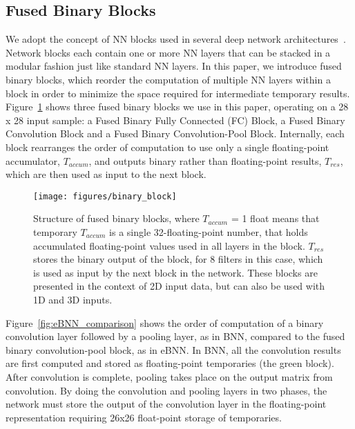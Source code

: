 \documentclass[10pt,emptycopyrightspace]{ewsn-proc}
\begin{document}
\subsection{Fused Binary Blocks}
We adopt the concept of NN blocks used in several deep network architectures~\cite{he2016identity}. Network blocks each contain one or more NN layers that can be stacked in a modular fashion just like standard NN layers. In this paper, we introduce fused binary blocks, which reorder the computation of multiple NN layers within a block in order to minimize the space required for intermediate temporary results. Figure~\ref{fig:binary_block} shows three fused binary blocks we use in this paper, operating on a 28 x 28 input sample: a Fused Binary Fully Connected (FC) Block, a Fused Binary Convolution Block and a Fused Binary Convolution-Pool Block. Internally, each block rearranges the order of computation to use only a single floating-point accumulator, $T_{accum}$, and outputs binary rather than floating-point results, $T_{res}$, which are then used as input to the next block.

\begin{figure}[b!]
  \centering
    \texttt{[image: figures/binary\_block]}
  \caption{Structure of fused binary blocks, where $T_{accum}$ = 1 float means that temporary $T_{accum}$ is a single 32-floating-point number, that holds accumulated floating-point values used in all layers in the block. $T_{res}$ stores the binary output of the block, for 8 filters in this case, which is used as input by the next block in the network. These blocks are presented in the context of 2D input data, but can also be used with 1D and 3D inputs.}
  \label{fig:binary_block}
\end{figure}

Figure~\ref{fig:eBNN_comparison} shows the order of computation of a binary convolution layer followed by a pooling layer, as in BNN, compared to the fused binary convolution-pool block, as in eBNN. In BNN, all the convolution results are first computed and stored as floating-point temporaries (the green block). After convolution is complete, pooling takes place on the output matrix from convolution. By doing the convolution and pooling layers in two phases, the network must store the output of the convolution layer in the floating-point representation requiring 26x26 float-point storage of temporaries.
\end{document}
